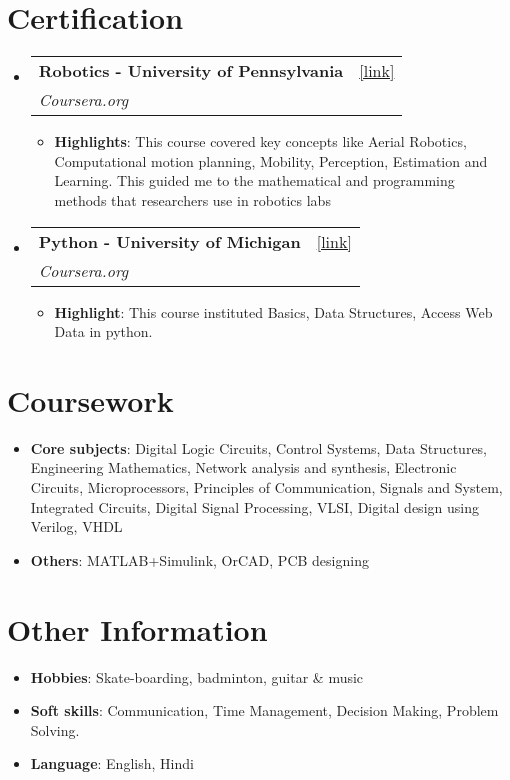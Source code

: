 \documentclass[letterpaper,11pt]{article}
\makeatletter
\newcommand{\resumeItem}[2]{
  \item\small{
    \textbf{#1}{: #2 \vspace{-2pt}}
  }
}
\newcommand{\resumeSubheading}[4]{
  \vspace{-1pt}\item
    \begin{tabular*}{0.97\textwidth}{l@{\extracolsep{\fill}}r}
      \textbf{#1} & #2 \\
      \textit{\small#3} & \textit{\small #4} \\
    \end{tabular*}\vspace{-5pt}
}
\newcommand{\resumeSubHeadingListStart}{\begin{itemize}[leftmargin=*]}
\newcommand{\resumeSubHeadingListEnd}{\end{itemize}}
\newcommand{\resumeItemListStart}{\begin{itemize}}
\newcommand{\resumeItemListEnd}{\end{itemize}\vspace{-5pt}}
\makeatother
\begin{document}
\section{Certification}
  \resumeSubHeadingListStart
    \resumeSubheading
      {Robotics - University of Pennsylvania}{\href{https://coursera.org}{[link]}}
      {Coursera.org}{}
      \resumeItemListStart
        \resumeItem{Highlights}
          {This course covered key concepts like Aerial Robotics, Computational motion planning, Mobility, Perception, Estimation and Learning.
          This guided me to the mathematical and programming methods that researchers use in robotics labs}
      \resumeItemListEnd
    
    \resumeSubheading
      {Python - University of Michigan}{\href{https://www.coursera.org/account/accomplishments/certificate/SWCNNDVNW9Y9}{[link]}}
      {Coursera.org}{}
      \resumeItemListStart
        \resumeItem{Highlight}
          {This course instituted Basics, Data Structures, Access Web Data in python.}
      \resumeItemListEnd
  \resumeSubHeadingListEnd

\section{Coursework}
  \resumeSubHeadingListStart
      \resumeItemListStart
        \resumeItem{Core subjects}{Digital Logic Circuits, Control Systems, Data Structures, Engineering Mathematics, Network analysis and synthesis, Electronic Circuits, Microprocessors, Principles of Communication, Signals and System, Integrated Circuits, Digital Signal Processing, VLSI, Digital design using Verilog, VHDL}
        \resumeItem{Others}{MATLAB+Simulink, OrCAD, PCB designing}
      \resumeItemListEnd
  \resumeSubHeadingListEnd

\section{Other Information}
  \resumeSubHeadingListStart
      \resumeItemListStart
        \resumeItem{Hobbies}{Skate-boarding, badminton, guitar \& music}
        \resumeItem{Soft skills}{Communication, Time Management, Decision Making, Problem Solving.}
        \resumeItem{Language}{English, Hindi}
      \resumeItemListEnd
  \resumeSubHeadingListEnd
\end{document}
